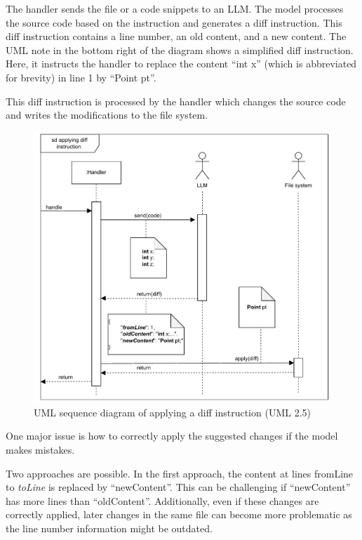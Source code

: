 The handler sends the file or a code snippets to an \ac{LLM}. The model processes the source code based on the instruction and generates a diff instruction. This diff instruction contains a line number, an old content, and a new content. The \ac{UML} note in the bottom right of the diagram shows a simplified diff instruction. Here, it instructs the handler to replace the content \enquote{int x} (which is abbreviated for brevity) in line 1 by \enquote{Point pt}. 

This diff instruction is processed by the handler which changes the source code  and writes the modifications to the file system. 
\begin{figure}[ht!]
    \centering
    \includegraphics[width=1\columnwidth]{figures/chapter4/sequence_diagram_piece_output.drawio.pdf}
    \caption{\ac{UML} sequence diagram of applying a diff instruction (UML 2.5)}
    \label{fig:json_based_changes}
\end{figure}





One major issue is how to correctly apply the suggested changes if the model makes mistakes. 

Two approaches are possible.
In the first approach, the content at lines \textit{}{fromLine} to \textit{toLine} is replaced by \enquote{newContent}. This can be challenging if \enquote{newContent} has more lines than \enquote{oldContent}. Additionally, even if these  changes are correctly applied, later changes in the same file can become more problematic as the line number information might be outdated. 


